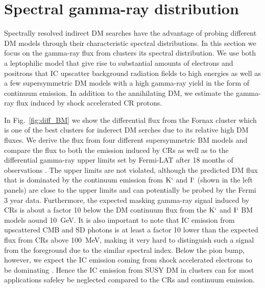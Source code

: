 \documentclass[10pt,aps,pra,reprint,amsmath,amsfonts,amssymb,showpacs]{revtex4-1}
\newcommand{\rmn}{\mathrm}
\newcommand{\Kp}{\rmn{K}`}
\newcommand{\Ip}{\rmn{I}`}
\begin{document}
\section{Spectral gamma-ray distribution}
Spectrally resolved indirect DM searches have the advantage of probing
different DM models through their characteristic spectral
distributions. In this section we focus on the gamma-ray flux from
clusters its spectral distribution. We use both a leptophilic model
that give rise to substantial amounts of electrons and positrons that
IC upscatter background radiation fields to high energies as well as a
few supersymmetric DM models with a high gamma-ray yield in the form of
continuum emission. In addition to the annihilating DM, we estimate
the gamma-ray flux induced by shock accelerated CR protons.

In Fig.~\ref{fig:diff_BM} we show the differential flux from the
Fornax cluster which is one of the best clusters for inderect DM
serches due to its relative high DM fluxes. We derive the flux from
four different supersymmetric BM models and compare the flux to both
the emission induced by CRs as well as to the differential gamma-ray
upper limits set by Fermi-LAT after 18 months of observations
\cite{2010ApJ...717L..71A}. The upper limits are not violated,
although the predicted DM flux that is dominated by the continuum
emission from $\Kp$ and $\Ip$ (shown in the left panels) are close to
the upper limits and can potentially be probed by the Fermi 3 year
data. Furthermore, the expected masking gamma-ray signal induced by
CRs is about a factor 10 below the DM continuum flux from the $\Kp$
and $\Ip$ BM models aound 10~GeV. It is also important to note that IC
emission from upscattered CMB and SD photons is at least a factor 10
lower than the expected flux from CRs above 100~MeV, making it very
hard to distinguish such a signal from the foreground due to the
similar spectral index. Below the pion bump, however, we expect the IC
emission coming from shock accelerated electrons to be dominating
\cite{2010MNRAS.409..449P}. Hence the IC emission from SUSY DM in
clusters can for most applications safeley be neglected compared to
the CRs and continuum emission.
\end{document}
